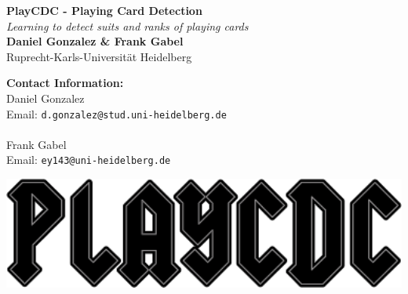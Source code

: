 \documentclass[a0,landscape]{a0poster}
\begin{document}


\begin{minipage}[b]{0.48\linewidth}
\veryHuge \color{NavyBlue} \textbf{PlayCDC - Playing Card Detection} \color{Black}\\ %
\Huge\textit{Learning to detect suits and ranks of playing cards}\\[1cm] %
\huge \textbf{Daniel Gonzalez \& Frank Gabel}\\ %
\huge Ruprecht-Karls-Universit\"at Heidelberg
\\ %
\end{minipage}
%
\begin{minipage}[b]{0.27\linewidth}
\color{DarkSlateGray}\Large \textbf{Contact Information:}\\
Daniel Gonzalez\\ %
Email: \texttt{d.gonzalez@stud.uni-heidelberg.de}\
\\\\
Frank Gabel \\
Email: \texttt{ey143@uni-heidelberg.de}\\ %
\end{minipage}
%
\begin{minipage}[b]{0.45\linewidth}

\includegraphics[width=30cm]{playcdc.png} %
\end{minipage}
\end{document}
